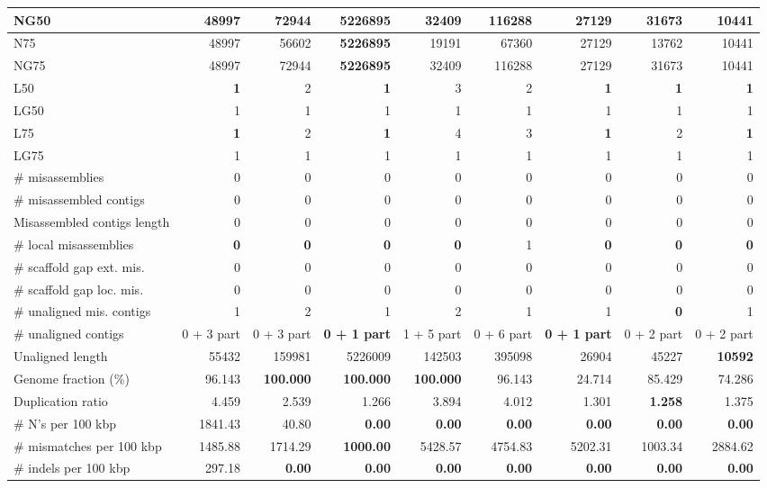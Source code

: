 \documentclass[12pt,a4paper]{article}
\begin{document}
\begin{table}[ht]
\begin{center}
\begin{tabular}{|l*{8}{|r}|}
NG50 & 48997 & 72944 & {\bf 5226895} & 32409 & 116288 & 27129 & 31673 & 10441 \\ \hline
N75 & 48997 & 56602 & {\bf 5226895} & 19191 & 67360 & 27129 & 13762 & 10441 \\ \hline
NG75 & 48997 & 72944 & {\bf 5226895} & 32409 & 116288 & 27129 & 31673 & 10441 \\ \hline
L50 & {\bf 1} & 2 & {\bf 1} & 3 & 2 & {\bf 1} & {\bf 1} & {\bf 1} \\ \hline
LG50 & 1 & 1 & 1 & 1 & 1 & 1 & 1 & 1 \\ \hline
L75 & {\bf 1} & 2 & {\bf 1} & 4 & 3 & {\bf 1} & 2 & {\bf 1} \\ \hline
LG75 & 1 & 1 & 1 & 1 & 1 & 1 & 1 & 1 \\ \hline
\# misassemblies & 0 & 0 & 0 & 0 & 0 & 0 & 0 & 0 \\ \hline
\# misassembled contigs & 0 & 0 & 0 & 0 & 0 & 0 & 0 & 0 \\ \hline
Misassembled contigs length & 0 & 0 & 0 & 0 & 0 & 0 & 0 & 0 \\ \hline
\# local misassemblies & {\bf 0} & {\bf 0} & {\bf 0} & {\bf 0} & 1 & {\bf 0} & {\bf 0} & {\bf 0} \\ \hline
\# scaffold gap ext. mis. & 0 & 0 & 0 & 0 & 0 & 0 & 0 & 0 \\ \hline
\# scaffold gap loc. mis. & 0 & 0 & 0 & 0 & 0 & 0 & 0 & 0 \\ \hline
\# unaligned mis. contigs & 1 & 2 & 1 & 2 & 1 & 1 & {\bf 0} & 1 \\ \hline
\# unaligned contigs & 0 + 3 part & 0 + 3 part & {\bf 0 + 1 part} & 1 + 5 part & 0 + 6 part & {\bf 0 + 1 part} & 0 + 2 part & 0 + 2 part \\ \hline
Unaligned length & 55432 & 159981 & 5226009 & 142503 & 395098 & 26904 & 45227 & {\bf 10592} \\ \hline
Genome fraction (\%) & 96.143 & {\bf 100.000} & {\bf 100.000} & {\bf 100.000} & 96.143 & 24.714 & 85.429 & 74.286 \\ \hline
Duplication ratio & 4.459 & 2.539 & 1.266 & 3.894 & 4.012 & 1.301 & {\bf 1.258} & 1.375 \\ \hline
\# N's per 100 kbp & 1841.43 & 40.80 & {\bf 0.00} & {\bf 0.00} & {\bf 0.00} & {\bf 0.00} & {\bf 0.00} & {\bf 0.00} \\ \hline
\# mismatches per 100 kbp & 1485.88 & 1714.29 & {\bf 1000.00} & 5428.57 & 4754.83 & 5202.31 & 1003.34 & 2884.62 \\ \hline
\# indels per 100 kbp & 297.18 & {\bf 0.00} & {\bf 0.00} & {\bf 0.00} & {\bf 0.00} & {\bf 0.00} & {\bf 0.00} & {\bf 0.00} \\ \hline

\end{tabular}
\end{center}
\end{table}
\end{document}

